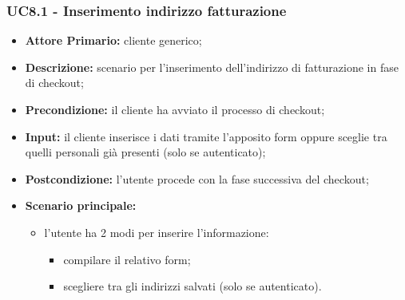 \subsubsection{UC8.1 - Inserimento indirizzo fatturazione}
\label{UC8.1}
\begin{itemize}
    \item \textbf{Attore Primario:} cliente generico;
    \item \textbf{Descrizione:} scenario per l'inserimento dell'indirizzo di fatturazione in fase di checkout;
    \item \textbf{Precondizione:} il cliente ha avviato il processo di checkout;
    \item \textbf{Input:} il cliente inserisce i dati tramite l'apposito form oppure sceglie tra quelli personali già presenti (solo se autenticato);
    \item \textbf{Postcondizione:} l'utente procede con la fase successiva del checkout;
    \item \textbf{Scenario principale:}
    \begin{itemize}
        \item l'utente ha 2 modi per inserire l'informazione:
        \begin{itemize}
            \item compilare il relativo form;
            \item scegliere tra gli indirizzi salvati (solo se autenticato).
        \end{itemize}
    \end{itemize}
\end{itemize}

